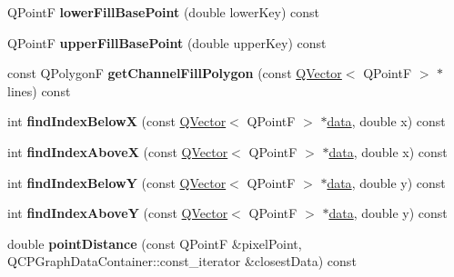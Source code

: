 \begin{DoxyCompactItemize}
\item 
Q\+PointF {\bfseries lower\+Fill\+Base\+Point} (double lower\+Key) const \hypertarget{class_q_c_p_graph_a41f982e8ceaefe6a53eb7432f26d64b6}{}\label{class_q_c_p_graph_a41f982e8ceaefe6a53eb7432f26d64b6}

\item 
Q\+PointF {\bfseries upper\+Fill\+Base\+Point} (double upper\+Key) const \hypertarget{class_q_c_p_graph_a363d066c179e0f46cc93c12bafb0bfba}{}\label{class_q_c_p_graph_a363d066c179e0f46cc93c12bafb0bfba}

\item 
const Q\+PolygonF {\bfseries get\+Channel\+Fill\+Polygon} (const \hyperlink{class_q_vector}{Q\+Vector}$<$ Q\+PointF $>$ $\ast$lines) const \hypertarget{class_q_c_p_graph_ab9f5bc0c2c98c90f287b4bbccf4944f6}{}\label{class_q_c_p_graph_ab9f5bc0c2c98c90f287b4bbccf4944f6}

\item 
int {\bfseries find\+Index\+BelowX} (const \hyperlink{class_q_vector}{Q\+Vector}$<$ Q\+PointF $>$ $\ast$\hyperlink{class_q_c_p_graph_a04514a2b1fb61a280ead66abe80b89ab}{data}, double x) const \hypertarget{class_q_c_p_graph_a6f4e9461d5925be9228fc4760249a04f}{}\label{class_q_c_p_graph_a6f4e9461d5925be9228fc4760249a04f}

\item 
int {\bfseries find\+Index\+AboveX} (const \hyperlink{class_q_vector}{Q\+Vector}$<$ Q\+PointF $>$ $\ast$\hyperlink{class_q_c_p_graph_a04514a2b1fb61a280ead66abe80b89ab}{data}, double x) const \hypertarget{class_q_c_p_graph_abab2a75b5e63630432bdd1f3b57f07fa}{}\label{class_q_c_p_graph_abab2a75b5e63630432bdd1f3b57f07fa}

\item 
int {\bfseries find\+Index\+BelowY} (const \hyperlink{class_q_vector}{Q\+Vector}$<$ Q\+PointF $>$ $\ast$\hyperlink{class_q_c_p_graph_a04514a2b1fb61a280ead66abe80b89ab}{data}, double y) const \hypertarget{class_q_c_p_graph_a6c4d556de3d1e02f548401001f72c6ff}{}\label{class_q_c_p_graph_a6c4d556de3d1e02f548401001f72c6ff}

\item 
int {\bfseries find\+Index\+AboveY} (const \hyperlink{class_q_vector}{Q\+Vector}$<$ Q\+PointF $>$ $\ast$\hyperlink{class_q_c_p_graph_a04514a2b1fb61a280ead66abe80b89ab}{data}, double y) const \hypertarget{class_q_c_p_graph_adf50243f1df203883a2187089734bfcb}{}\label{class_q_c_p_graph_adf50243f1df203883a2187089734bfcb}

\item 
double {\bfseries point\+Distance} (const Q\+PointF \&pixel\+Point, Q\+C\+P\+Graph\+Data\+Container\+::const\+\_\+iterator \&closest\+Data) const \hypertarget{class_q_c_p_graph_a619f22c55dffe9e6f380c5c79e3d9f0f}{}\label{class_q_c_p_graph_a619f22c55dffe9e6f380c5c79e3d9f0f}


\end{DoxyCompactItemize}
